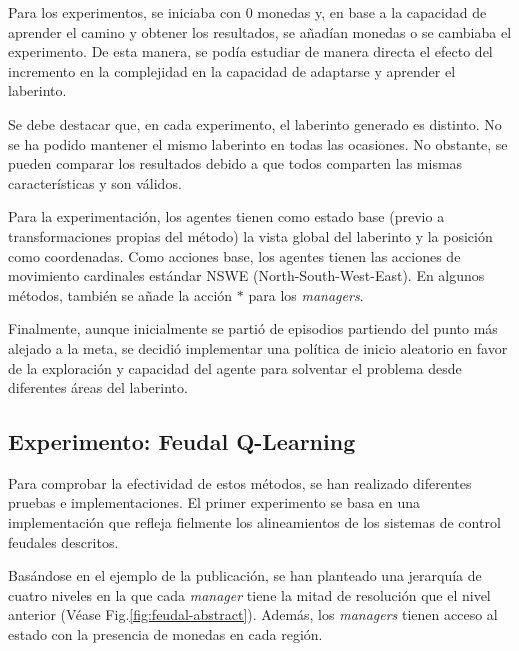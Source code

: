 \documentclass[letterpaper]{article} %
\begin{document}
Para los experimentos, se iniciaba con 0 monedas y, en base a la capacidad de aprender el camino y obtener los resultados, se añadían monedas o se cambiaba el experimento.
De esta manera, se podía estudiar de manera directa el efecto del incremento en la complejidad en la capacidad de adaptarse y aprender el laberinto. 

Se debe destacar que, en cada experimento, el laberinto generado es distinto. No se ha podido mantener el mismo laberinto en todas las ocasiones. No obstante,
se pueden comparar los resultados debido a que todos comparten las mismas características y son válidos.

Para la experimentación, los agentes tienen como estado base (previo a transformaciones propias del método) la vista global del laberinto y la posición como coordenadas. 
Como acciones base, los agentes tienen las acciones de movimiento cardinales estándar NSWE (North-South-West-East). En algunos métodos, 
también se añade la acción $*$ para los \textit{managers}.

Finalmente, aunque inicialmente se partió de episodios partiendo del punto más alejado a la meta, se decidió implementar una política de inicio aleatorio en favor de la exploración y capacidad del agente para solventar el problema desde diferentes áreas del laberinto.

\subsection{Experimento: Feudal Q-Learning}
Para comprobar la efectividad de estos métodos, se han realizado diferentes pruebas e implementaciones. El primer experimento
se basa en una implementación que refleja fielmente los alineamientos de los sistemas de control feudales descritos. 

Basándose en el ejemplo de la publicación, se han planteado una jerarquía de cuatro niveles en la que cada \textit{manager} tiene la mitad de resolución 
que el nivel anterior (Véase Fig.\ref{fig:feudal-abstract}). Además, los \textit{managers} tienen acceso al estado con la presencia de monedas en cada región.  
\end{document}
